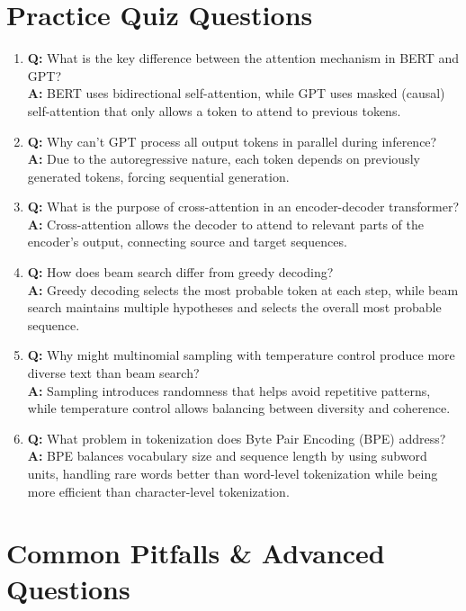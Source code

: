 \section{Practice Quiz Questions}

\begin{enumerate}
    \item \textbf{Q:} What is the key difference between the attention mechanism in BERT and GPT?\\
    \textbf{A:} BERT uses bidirectional self-attention, while GPT uses masked (causal) self-attention that only allows a token to attend to previous tokens.

    \item \textbf{Q:} Why can't GPT process all output tokens in parallel during inference?\\
    \textbf{A:} Due to the autoregressive nature, each token depends on previously generated tokens, forcing sequential generation.

    \item \textbf{Q:} What is the purpose of cross-attention in an encoder-decoder transformer?\\
    \textbf{A:} Cross-attention allows the decoder to attend to relevant parts of the encoder's output, connecting source and target sequences.

    \item \textbf{Q:} How does beam search differ from greedy decoding?\\
    \textbf{A:} Greedy decoding selects the most probable token at each step, while beam search maintains multiple hypotheses and selects the overall most probable sequence.

    \item \textbf{Q:} Why might multinomial sampling with temperature control produce more diverse text than beam search?\\
    \textbf{A:} Sampling introduces randomness that helps avoid repetitive patterns, while temperature control allows balancing between diversity and coherence.

    \item \textbf{Q:} What problem in tokenization does Byte Pair Encoding (BPE) address?\\
    \textbf{A:} BPE balances vocabulary size and sequence length by using subword units, handling rare words better than word-level tokenization while being more efficient than character-level tokenization.
\end{enumerate}
\section{Common Pitfalls \& Advanced Questions}

